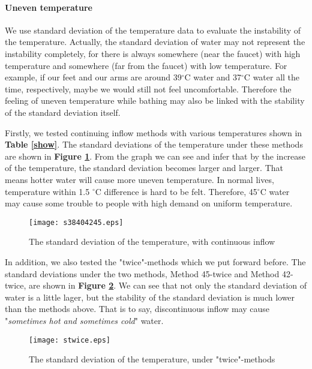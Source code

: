 \documentclass{HZNUMCM}
\begin{document}
\paragraph{Uneven temperature}
We use standard deviation of the temperature data to evaluate the instability of the temperature.
Actually, the standard deviation of water may not represent the instability completely, for there is
always somewhere (near the faucet) with high temperature and somewhere (far from the faucet) with
low temperature. For example, if our feet and our arms are around 39$^\circ$C water and 37$^\circ$C
water all the time, respectively, maybe we would still not feel uncomfortable. Therefore the feeling
of uneven temperature while bathing may also be linked with the stability of the standard deviation
itself.

Firstly, we tested continuing inflow methods with various temperatures shown in \textbf{Table
\ref{show}}. The standard deviations of the temperature under these methods are shown in
\textbf{Figure \ref{s1}}. From the graph we can see and infer that by the increase of the
temperature, the standard deviation becomes larger and larger. That means hotter water will cause
more uneven temperature. In normal lives, temperature within 1.5 $^\circ$C difference is hard to be
felt. Therefore, 45$^\circ$C water may cause some trouble to people with high demand on uniform
temperature.
\begin{figure}[!htbp]
    \small
    \centering
    \texttt{[image: s38404245.eps]}
    \caption{The standard deviation of the temperature, with continuous inflow}\label{s1}
\end{figure}

In addition, we also tested the "twice"-methods which we put forward before. The standard deviations
under the two methods, Method 45-twice and Method 42-twice, are shown in \textbf{Figure \ref{s2}}.
We can see that not only the standard deviation of water is a little lager, but the stability of the
standard deviation is much lower than the methods above. That is to say, discontinuous inflow may
cause "\emph{sometimes hot and sometimes cold}" water.
\begin{figure}[!htbp]
    \small
    \centering
    \texttt{[image: stwice.eps]}
    \caption{The standard deviation of the temperature, under "twice"-methods}\label{s2}
\end{figure}
\end{document}
